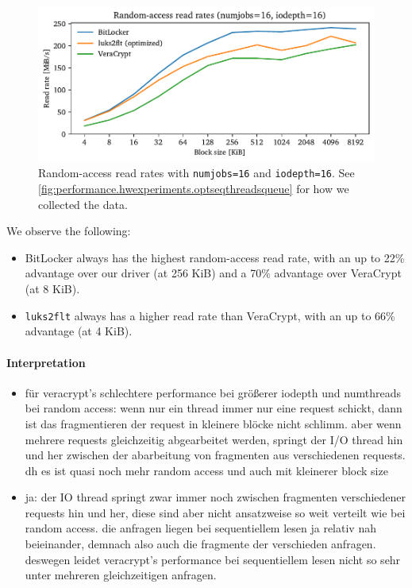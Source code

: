 \begin{figure}[htb!]
	\center
	\includegraphics[scale=1]{../fig/performance.hwexperiments.optrandthreadsqueue.pdf}
	\caption[
		Random-access read rates with \texttt{numjobs=16} and \texttt{iodepth=16}
	]{
		Random-access read rates with \texttt{numjobs=16} and \texttt{iodepth=16}. See \autoref{fig:performance.hwexperiments.optseqthreadsqueue} for how we collected the data.
	}
	\label{fig:performance.hwexperiments.optrandthreadsqueue}
\end{figure}

We observe the following:
\begin{itemize}
	\item BitLocker always has the highest random-access read rate, with an up to 22\% advantage over our driver (at 256 KiB) and a 70\% advantage over VeraCrypt (at 8 KiB).
	\item \texttt{luks2flt} always has a higher read rate than VeraCrypt, with an up to 66\% advantage (at 4 KiB).
\end{itemize}

\paragraph{Interpretation}
\begin{itemize}
	\item {} für veracrypt's schlechtere performance bei größerer iodepth und numthreads bei random access: wenn nur ein thread immer nur eine request schickt, dann ist das fragmentieren der request in kleinere blöcke nicht schlimm. aber wenn mehrere requests gleichzeitig abgearbeitet werden, springt der I/O thread hin und her zwischen der abarbeitung von fragmenten aus verschiedenen requests. dh es ist quasi noch mehr random access und auch mit kleinerer block size
	\item {} ja: der IO thread springt zwar immer noch zwischen fragmenten verschiedener requests hin und her, diese sind aber nicht ansatzweise so weit verteilt wie bei random access. die anfragen liegen bei sequentiellem lesen ja relativ nah beieinander, demnach also auch die fragmente der verschieden anfragen. deswegen leidet veracrypt's performance bei sequentiellem lesen nicht so sehr unter mehreren gleichzeitigen anfragen.
\end{itemize}

